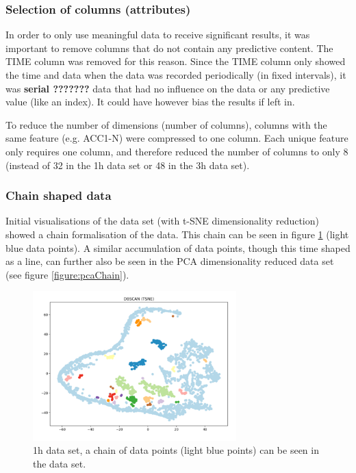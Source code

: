 \subsubsection{Selection of columns (attributes)}
In order to only use meaningful data to receive significant results, it was important to remove columns that do not contain any predictive content. The TIME column was removed for this reason. Since the TIME column only showed the time and data when the data was recorded periodically (in fixed intervals), it was \textbf{serial ???????} data that had no influence on the data or any predictive value (like an index). It could have however bias the results if left in. 

To reduce the number of dimensions (number of columns), columns with the same feature (e.g. ACC1-N) were compressed to one column. Each unique feature only requires one column, and therefore reduced the number of columns to only 8 (instead of 32 in the 1h data set or 48 in the 3h data set).


\subsubsection{Chain shaped data}
Initial visualisations of the data set (with t-SNE dimensionality reduction) showed a chain formalisation of the data. This chain can be seen in figure \ref{figure:tsneChain} (light blue data points). A similar accumulation of data points, though this time shaped as a line, can further also be seen in the PCA dimensionality reduced data set (see figure \ref{figure:pcaChain}). 


\begin{figure}[h]
  \centering
  \includegraphics[width=0.7\textwidth]{./images/tsneChain.png}
  \caption{1h data set, a chain of data points (light blue points) can be seen in the data set.}
  \label{figure:tsneChain}
\end{figure}


